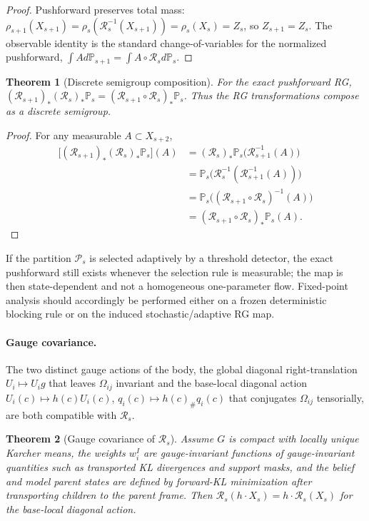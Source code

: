 \documentclass[11pt]{article}
\newtheorem{theorem}{Theorem}
\begin{document}
\begin{proof}
Pushforward preserves total mass: $\rho_{s+1}(X_{s+1}) = \rho_s(\mathcal{R}_s^{-1}(X_{s+1})) = \rho_s(X_s) = Z_s$, so $Z_{s+1} = Z_s$. The observable identity is the standard change-of-variables for the normalized pushforward, $\int A  d\mathbb{P}_{s+1} = \int A\circ\mathcal{R}_s  d\mathbb{P}_s$.
\end{proof}

\begin{theorem}[Discrete semigroup composition]
\label{thm:rg_semigroup}
For the exact pushforward RG, $(\mathcal{R}_{s+1})_*(\mathcal{R}_s)_*\mathbb{P}_s = (\mathcal{R}_{s+1} \circ \mathcal{R}_s)_*\mathbb{P}_s$. Thus the RG transformations compose as a discrete semigroup.
\end{theorem}

\begin{proof}
For any measurable $A \subset X_{s+2}$,
\begin{align*}
\big[(\mathcal{R}_{s+1})_*(\mathcal{R}_s)_*\mathbb{P}_s\big](A)
 &= (\mathcal{R}_s)_*\mathbb{P}_s\big(\mathcal{R}_{s+1}^{-1}(A)\big) \\
 &= \mathbb{P}_s\big(\mathcal{R}_s^{-1}(\mathcal{R}_{s+1}^{-1}(A))\big) \\
 &= \mathbb{P}_s\big((\mathcal{R}_{s+1} \circ \mathcal{R}_s)^{-1}(A)\big) \\
 &= (\mathcal{R}_{s+1} \circ \mathcal{R}_s)_*\mathbb{P}_s(A).
\end{align*}
\end{proof}

If the partition $\mathcal{P}_s$ is selected adaptively by a threshold detector, the exact pushforward still exists whenever the selection rule is measurable; the map is then state-dependent and not a homogeneous one-parameter flow. Fixed-point analysis should accordingly be performed either on a frozen deterministic blocking rule or on the induced stochastic/adaptive RG map.

\paragraph{Gauge covariance.}
The two distinct gauge actions of the body, the global diagonal right-translation $U_i \mapsto U_i g$ that leaves $\Omega_{ij}$ invariant and the base-local diagonal action $U_i(c) \mapsto h(c) U_i(c)$, $q_i(c) \mapsto h(c)_\# q_i(c)$ that conjugates $\Omega_{ij}$ tensorially, are both compatible with $\mathcal{R}_s$.

\begin{theorem}[Gauge covariance of $\mathcal{R}_s$]
\label{thm:rg_covariance}
Assume $G$ is compact with locally unique Karcher means, the weights $w_i^I$ are gauge-invariant functions of gauge-invariant quantities such as transported KL divergences and support masks, and the belief and model parent states are defined by forward-KL minimization after transporting children to the parent frame. Then $\mathcal{R}_s(h \cdot X_s) = h \cdot \mathcal{R}_s(X_s)$ for the base-local diagonal action.
\end{theorem}
\end{document}

